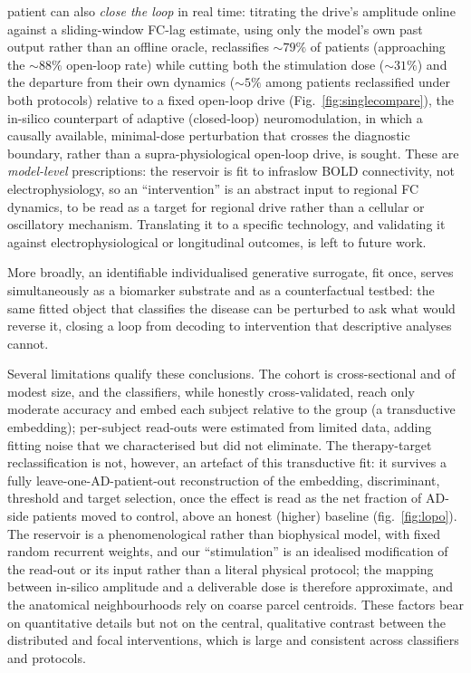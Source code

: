 \documentclass[11pt]{article}
\begin{document}
patient can also \emph{close the loop} in real time: titrating the drive's
amplitude online against a sliding-window FC-lag estimate, using only the model's
own past output rather than an offline oracle, reclassifies $\sim$$79\%$ of patients
(approaching the $\sim$$88\%$ open-loop rate) while cutting both the stimulation
dose ($\sim$$31\%$) and the departure from their own dynamics ($\sim$$5\%$ among
patients reclassified under both protocols) relative to a fixed open-loop drive
(Fig.~\ref{fig:singlecompare}), the in-silico counterpart of adaptive
(closed-loop) neuromodulation, in which a causally available, minimal-dose
perturbation that crosses the diagnostic boundary, rather than a
supra-physiological open-loop drive, is sought. These are \emph{model-level} prescriptions: the reservoir is fit to infraslow BOLD connectivity, not electrophysiology, so an ``intervention'' is an abstract input to regional FC dynamics, to be read as a target for regional drive rather than a cellular or oscillatory mechanism. Translating it to a specific technology, and validating it against electrophysiological or longitudinal outcomes, is left to future work.

More broadly, an identifiable individualised generative surrogate, fit once, serves simultaneously as a biomarker substrate and as a counterfactual testbed: the same fitted object that classifies the disease can be perturbed to ask what would reverse it, closing a loop from decoding to intervention that descriptive analyses cannot.

Several limitations qualify these conclusions. The cohort is cross-sectional and
of modest size, and the classifiers, while honestly cross-validated, reach only
moderate accuracy and embed each subject relative to the group (a transductive
embedding); per-subject read-outs were estimated from limited data, adding
fitting noise that we characterised but did not eliminate. The therapy-target
reclassification is not, however, an artefact of this transductive fit: it
survives a fully leave-one-AD-patient-out reconstruction of the embedding,
discriminant, threshold and target selection, once the effect is read as the net
fraction of AD-side patients moved to control, above an honest (higher) baseline
(fig.~\ref{fig:lopo}). The reservoir is a
phenomenological rather than biophysical model, with fixed random recurrent
weights, and our ``stimulation'' is an idealised modification of the read-out or
its input rather than a literal physical protocol; the mapping between in-silico
amplitude and a deliverable dose is therefore approximate, and the anatomical
neighbourhoods rely on coarse parcel centroids. These factors bear on
quantitative details but not on the central, qualitative contrast between the
distributed and focal interventions, which is large and consistent across
classifiers and protocols.
\end{document}
